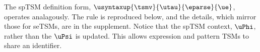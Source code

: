 \documentclass[acmlarge,review,anonymous]{acmart}\settopmatter{printfolios=true}
\begin{document}
The spTSM definition form, $\usyntaxup{\tsmv}{\utau}{\eparse}{\ue}$, operates analagously. The rule is reproduced below, and the details, which mirror those for seTSMs, are in the supplement. Notice that the spTSM context, $\uPhi$, rather than the $\uPsi$ is updated. This allows expression and pattern TSMs to share an identifier.
\begin{mathpar}
\end{mathpar}


\end{document}
